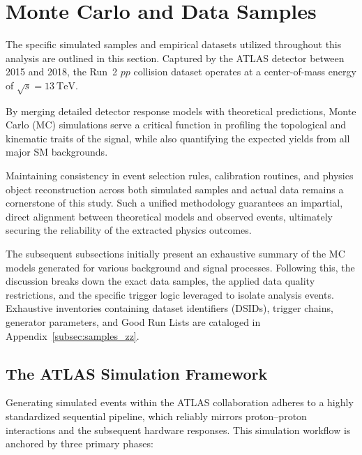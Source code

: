\section{Monte Carlo and Data Samples}
\label{sec:llvv_samples}

The specific simulated samples and empirical datasets utilized throughout this analysis are outlined in this section. Captured by the ATLAS detector between 2015 and 2018, the Run~2 $pp$ collision dataset operates at a center-of-mass energy of $\sqrt{s} = 13~\text{TeV}$.

By merging detailed detector response models with theoretical predictions, Monte Carlo (MC) simulations serve a critical function in profiling the topological and kinematic traits of the signal, while also quantifying the expected yields from all major SM backgrounds.

Maintaining consistency in event selection rules, calibration routines, and physics object reconstruction across both simulated samples and actual data remains a cornerstone of this study. Such a unified methodology guarantees an impartial, direct alignment between theoretical models and observed events, ultimately securing the reliability of the extracted physics outcomes.

The subsequent subsections initially present an exhaustive summary of the MC models generated for various background and signal processes. Following this, the discussion breaks down the exact data samples, the applied data quality restrictions, and the specific trigger logic leveraged to isolate analysis events. Exhaustive inventories containing dataset identifiers (DSIDs), trigger chains, generator parameters, and Good Run Lists are cataloged in Appendix~\ref{subsec:samples_zz}.

\subsection{The ATLAS Simulation Framework}
Generating simulated events within the ATLAS collaboration adheres to a highly standardized sequential pipeline, which reliably mirrors proton--proton interactions and the subsequent hardware responses. This simulation workflow is anchored by three primary phases:

